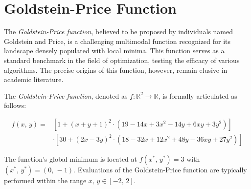 \section{Goldstein-Price Function}
\label{sec:test_functions:goldstein_price}
  The \emph{Goldstein-Price function}, believed to be proposed by individuals
  named Goldstein and Price, is a challenging multimodal function recognized for
  its landscape densely populated with local minima.
  This function serves as a standard benchmark in the field of optimization,
  testing the efficacy of various algorithms.
  The precise origins of this function, however, remain elusive in academic
  literature.

  \begin{definition}
    \label{def:test_functions:goldstein_price}
      The \emph{Goldstein-Price function}, denoted as \(f: \mathbb{R}^2
      \rightarrow \mathbb{R}\), is formally articulated as follows:

      \begin{equation}
      \label{eq:test_functions:goldstein_price}
        \begin{split}
          f(x,\,y) = 
            & \left[
                1 + (x + y + 1)^2 
                  \cdot (19 - 14x + 3x^2 - 14y + 6xy + 3y^2) 
              \right] \\
            & \cdot \left[ 
                30 + (2x - 3y)^2 
                  \cdot (18 - 32x + 12x^2 + 48y - 36xy + 27y^2) 
              \right]
        \end{split}
      \end{equation}
  \end{definition}

  The function's global minimum is located at \(f(x^*,\,y^*) = 
  3\) with \((x^*,\,y^*) = (0,\,-1)\).
  Evaluations of the Goldstein-Price function are typically performed within the
  range \(x,\,y \in [-2,\, 2]\).

